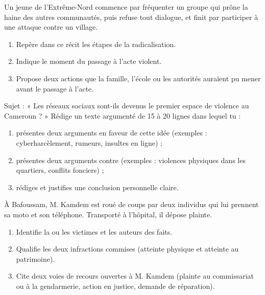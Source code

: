 \documentclass[11pt]{article}
\newcommand{\cle}[1]{{\popxbold\color{popdark}#1}}
\newcounter{popsec}
\newcounter{popsub}
\newcommand{\courssub}[1]{%
  \stepcounter{popsub}%
  \par\vspace{9pt}\noindent{\popxbold\fontsize{11.5}{13}\selectfont\color{popink}{\color{poporange}\thepopsec.\thepopsub}\hspace{6pt}#1}\par\nopagebreak\vspace{4pt}
}
\begin{document}
\begin{exercice}
Un jeune de l'Extrême-Nord commence par fréquenter un groupe qui prône la haine des autres communautés, puis refuse tout dialogue, et finit par participer à une attaque contre un village.
\begin{enumerate}
\item Repère dans ce récit les étapes de la \cle{radicalisation}.
\item Indique le moment du \cle{passage à l'acte} violent.
\item Propose deux actions que la famille, l'école ou les autorités auraient pu mener avant le passage à l'acte.
\end{enumerate}
\end{exercice}

\begin{exercice}
Sujet : « Les réseaux sociaux sont-ils devenus le premier espace de violence au Cameroun ? »
Rédige un texte argumenté de 15 à 20 lignes dans lequel tu :
\begin{enumerate}
\item présentes deux arguments en faveur de cette idée (exemples : cyberharcèlement, rumeurs, insultes en ligne) ;
\item présentes deux arguments contre (exemples : violences physiques dans les quartiers, conflits fonciers) ;
\item rédiges et justifies une conclusion personnelle claire.
\end{enumerate}
\end{exercice}

\begin{exercice}
À Bafoussam, M. Kamdem est roué de coups par deux individus qui lui prennent sa moto et son téléphone. Transporté à l'hôpital, il dépose plainte.
\begin{enumerate}
\item Identifie la ou les victimes et les auteurs des faits.
\item Qualifie les deux infractions commises (atteinte physique et atteinte au patrimoine).
\item Cite deux voies de recours ouvertes à M. Kamdem (plainte au commissariat ou à la gendarmerie, action en justice, demande de réparation).
\end{enumerate}
\end{exercice}

\courssub{Je me prépare au Bac}
\end{document}
